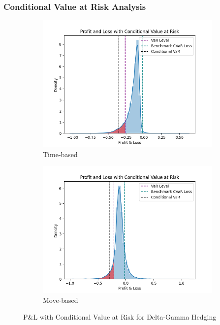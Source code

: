 \documentclass[12pt]{article}
\begin{document}
\subsubsection{Conditional Value at Risk Analysis}
\begin{figure}[H]
  \centering
  \begin{subfigure}{.5\textwidth}
    \centering
    \includegraphics[width=\linewidth]{gamma-var-t.png}
    \caption{Time-based}
  \end{subfigure}%
  \begin{subfigure}{.5\textwidth}
    \centering
    \includegraphics[width=\linewidth]{gamma-var-m.png}
    \caption{Move-based}
  \end{subfigure}%
  \caption{P\&L with Conditional Value at Risk for Delta-Gamma Hedging}
\end{figure}
\end{document}
